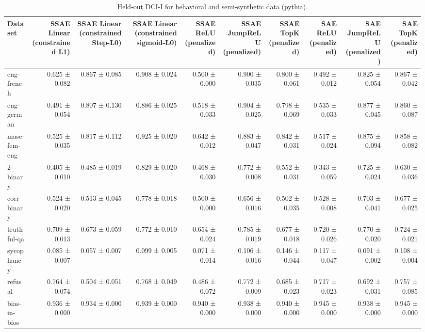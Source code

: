 \begin{table}[t]
\centering
\caption{Held-out DCI-I for behavioral and semi-synthetic data (pythia).}
\label{tab:all-datasets-pythia-dci-i}
\begin{tabular}{lrrrrrrrrr}
\toprule
Dataset & SSAE Linear (constrained L1) & SSAE Linear (constrained Step-L0) & SSAE Linear (constrained sigmoid-L0) & SSAE ReLU (penalized) & SSAE JumpReLU (penalized) & SSAE TopK (penalized) & SAE ReLU (penalized) & SAE JumpReLU (penalized) & SAE TopK (penalized) \\
\midrule
eng-french & 0.625 ± 0.082 & 0.867 ± 0.085 & 0.908 ± 0.024 & 0.500 ± 0.000 & 0.900 ± 0.035 & 0.800 ± 0.061 & 0.492 ± 0.012 & 0.825 ± 0.054 & 0.867 ± 0.042 \\
eng-german & 0.491 ± 0.054 & 0.807 ± 0.130 & 0.886 ± 0.025 & 0.518 ± 0.033 & 0.904 ± 0.025 & 0.798 ± 0.069 & 0.535 ± 0.033 & 0.877 ± 0.045 & 0.860 ± 0.087 \\
masc-fem-eng & 0.525 ± 0.035 & 0.817 ± 0.112 & 0.925 ± 0.020 & 0.642 ± 0.012 & 0.883 ± 0.047 & 0.842 ± 0.031 & 0.517 ± 0.024 & 0.875 ± 0.094 & 0.858 ± 0.082 \\
2-binary & 0.405 ± 0.010 & 0.485 ± 0.019 & 0.829 ± 0.020 & 0.468 ± 0.030 & 0.772 ± 0.008 & 0.552 ± 0.031 & 0.343 ± 0.059 & 0.725 ± 0.024 & 0.630 ± 0.036 \\
corr-binary & 0.524 ± 0.020 & 0.513 ± 0.045 & 0.778 ± 0.018 & 0.500 ± 0.000 & 0.656 ± 0.016 & 0.502 ± 0.035 & 0.528 ± 0.008 & 0.703 ± 0.041 & 0.677 ± 0.025 \\
truthful-qa & 0.709 ± 0.013 & 0.673 ± 0.059 & 0.772 ± 0.010 & 0.654 ± 0.024 & 0.785 ± 0.019 & 0.677 ± 0.018 & 0.720 ± 0.026 & 0.770 ± 0.020 & 0.724 ± 0.021 \\
sycophancy & 0.085 ± 0.007 & 0.057 ± 0.007 & 0.099 ± 0.005 & 0.071 ± 0.014 & 0.106 ± 0.016 & 0.146 ± 0.044 & 0.117 ± 0.047 & 0.091 ± 0.002 & 0.108 ± 0.004 \\
refusal & 0.764 ± 0.074 & 0.504 ± 0.051 & 0.768 ± 0.049 & 0.486 ± 0.072 & 0.772 ± 0.009 & 0.685 ± 0.023 & 0.717 ± 0.023 & 0.692 ± 0.031 & 0.757 ± 0.085 \\
bias-in-bios & 0.936 ± 0.000 & 0.934 ± 0.000 & 0.939 ± 0.000 & 0.940 ± 0.000 & 0.938 ± 0.000 & 0.940 ± 0.000 & 0.945 ± 0.000 & 0.938 ± 0.000 & 0.945 ± 0.000 \\
\bottomrule
\end{tabular}
\end{table}
